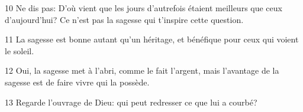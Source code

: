 
10 Ne dis pas: D’où vient que les jours d’autrefois étaient meilleurs que ceux d’aujourd’hui? Ce n’est pas la sagesse qui t’inspire cette question.

11 La sagesse est bonne autant qu’un héritage, et bénéfique pour ceux qui voient le soleil.

12 Oui, la sagesse met à l’abri, comme le fait l’argent, mais l’avantage de la sagesse est de faire vivre qui la possède.

13 Regarde l’ouvrage de Dieu: qui peut redresser ce que lui a courbé?
